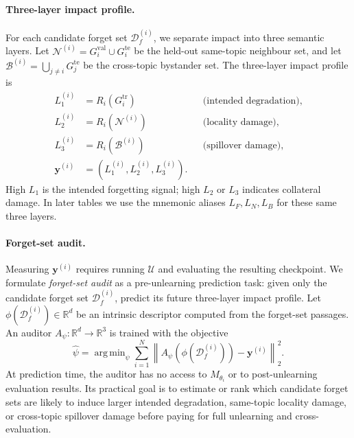 \documentclass[11pt,a4paper]{article}
\newcommand{\R}{\mathbb{R}}
\newcommand{\Df}{\mathcal{D}_f}
\newcommand{\Lone}{L_1}
\newcommand{\Ltwo}{L_2}
\newcommand{\Lthree}{L_3}
\newcommand{\Lforget}{L_F}
\newcommand{\Lneigh}{L_N}
\newcommand{\Lbyst}{L_B}
\DeclareMathOperator*{\argmin}{arg\,min}
\begin{document}
\paragraph{Three-layer impact profile.}
For each candidate forget set $\Df^{(i)}$, we separate impact into three
semantic layers. Let
$\mathcal{N}^{(i)}=G_i^{\mathrm{val}}\cup G_i^{\mathrm{te}}$ be the held-out
same-topic neighbour set, and let
$\mathcal{B}^{(i)}=\bigcup_{j\neq i}G_j^{\mathrm{te}}$ be the cross-topic
bystander set. The three-layer impact profile is
\begin{align}
    \Lone^{(i)} &= R_i(G_i^{\mathrm{tr}})
    &&\text{(intended degradation)},\\
    \Ltwo^{(i)} &= R_i(\mathcal{N}^{(i)})
    &&\text{(locality damage)},\\
    \Lthree^{(i)} &= R_i(\mathcal{B}^{(i)})
    &&\text{(spillover damage)},\\
    \mathbf{y}^{(i)}
    &=\left(\Lone^{(i)},\Ltwo^{(i)},\Lthree^{(i)}\right).
\end{align}
High $\Lone$ is the intended forgetting signal; high $\Ltwo$ or $\Lthree$
indicates collateral damage. In later tables we use the mnemonic aliases
$\Lforget,\Lneigh,\Lbyst$ for these same three layers.

\paragraph{Forget-set audit.}
Measuring $\mathbf{y}^{(i)}$ requires running $\mathcal{U}$ and evaluating the
resulting checkpoint. We formulate \emph{forget-set audit} as a
pre-unlearning prediction task: given only the candidate forget set
$\Df^{(i)}$, predict its future three-layer impact profile. Let
$\phi(\Df^{(i)})\in\R^d$ be an intrinsic descriptor computed from the
forget-set passages. An auditor
$A_{\psi}: \R^d \rightarrow \R^3$ is trained with the objective
\begin{equation}
    \hat{\psi}
    =
    \argmin_{\psi}
    \sum_{i=1}^{N}
    \left\|
    A_{\psi}\!\left(\phi(\Df^{(i)})\right)
    -
    \mathbf{y}^{(i)}
    \right\|_2^2.
\end{equation}
At prediction time, the auditor has no access to $M_{\theta_i}$ or to
post-unlearning evaluation results. Its practical goal is to estimate or rank
which candidate forget sets are likely to induce larger intended degradation,
same-topic locality damage, or cross-topic spillover damage before paying for
full unlearning and cross-evaluation.
\end{document}
